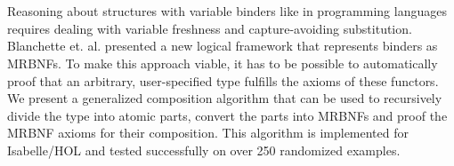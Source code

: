 \chapter{\abstractname}

Reasoning about structures with variable binders like in programming languages requires dealing with variable freshness and capture-avoiding substitution. Blanchette et. al. presented a new logical framework that represents binders as \acfp{MRBNF}. To make this approach viable, it has to be possible to automatically proof that an arbitrary, user-specified type fulfills the axioms of these functors. We present a generalized composition algorithm that can be used to recursively divide the type into atomic parts, convert the parts into \acp{MRBNF} and proof the \ac{MRBNF} axioms for their composition. This algorithm is implemented for Isabelle/HOL and tested successfully on over 250 randomized examples.
